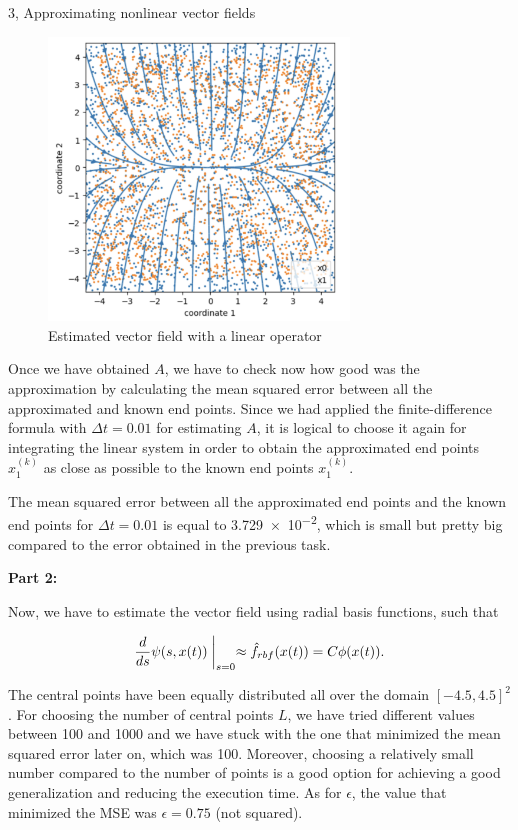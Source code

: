 \documentclass[10pt,a4paper]{article}
\begin{document}
\begin{task}{3, Approximating nonlinear vector fields}
\begin{figure}[H]
    \centering
    \includegraphics[width=8cm]{images/non_linear_vector_field.png}
    \caption{Estimated vector field with a linear operator}
    \label{non_linear_vector_field}
\end{figure}

Once we have obtained $A$, we have to check now how good was the approximation by calculating the mean squared error between all the approximated and known end points. Since we had applied the finite-difference formula with $\Delta t = 0.01$ for estimating $A$, it is logical to choose it again for integrating the linear system in order to obtain the approximated end points $\hat{x}^{(k)}_{1}$ as close as possible to the known end points $x^{(k)}_{1}$.

The mean squared error between all the approximated end points and the known end points for $\Delta t = 0.01$ is equal to \num{3.729e-2}, which is small but pretty big compared to the error obtained in the previous task.

\newpage

\noindent \textbf{Part 2:} 

Now, we have to estimate the vector field using radial basis functions, such that 

\begin{equation}\label{rbf}
    \frac{d}{ds} \psi(s, x(t)) \biggm| _{s = 0} \approx \hat{f}_{rbf}(x(t)) = C\phi(x(t)).
\end{equation}

The central points have been equally distributed all over the domain $[-4.5, 4.5]^{2}$. For choosing the number of central points $L$, we have tried different values between 100 and 1000 and we have stuck with the one that minimized the mean squared error later on, which was 100. Moreover, choosing a relatively small number compared to the number of points is a good option for achieving a good generalization and reducing the execution time. As for $\epsilon$, the value that minimized the MSE was $\epsilon = 0.75$ (not squared).


\end{task}
\end{document}
